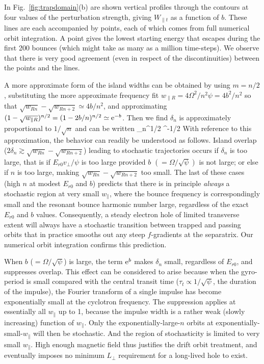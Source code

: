 \documentclass{agujournal2019}
\let\oldequation\equation
\let\oldendequation\endequation
\renewenvironment{equation}
  {\linenomathNonumbers\oldequation}
  {\oldendequation\endlinenomath}
\def\wp{w_\parallel}
\def\wr{w_{\parallel R}}
\begin{document}
In Fig.\ \ref{fig:trapdomain}(b) are shown vertical profiles through
the contours at four values of the perturbation strength, giving
$W_{\parallel t}$ as a function of $b$. These lines are each
accompanied by points, each of which comes from full numerical orbit
integration. A point gives the lowest starting energy that escapes
during the first 200 bounces (which might take as many as a million
time-steps). We observe that there is very good agreement (even in
respect of the discontinuities) between the points and the lines. 

A more approximate form of the island widths can be obtained by using
$m=n/2$, substituting the more approximate frequency fit
$\wr =4\Omega^2/n^2\psi=4b^2/n^2$ so that
$\sqrt{w_{Rn}}-\sqrt{w_{Rn+2}}\simeq 4b/n^2$, and approximating
$(1-\sqrt{\wr })^{n/2} =(1-2b/n)^{n/2}\simeq {\rm e}^{-b}$. Then we
find $\delta_n$ is approximately proportional to $1/\sqrt{n}$ and can
be written
\begin{equation}
  \label{eq:halfomega}
 \delta_n\simeq{}^{1/2}
 ^{-1/2}
\end{equation}
With reference to this approximation, the behavior can readily be
understood as follows. Island overlap
($2\delta_n\gtrsim \sqrt{w_{Rn}}-\sqrt{w_{Rn+2}}$) leading to
stochastic trajectories occurs if $\delta_n$ is too large, that is if
$E_{r0}v_\perp/\psi$ is too large provided $b$ $(=\Omega/\sqrt\psi)$ is not
large; or else if $n$ is too large, making
$\sqrt{w_{Rn}}-\sqrt{w_{Rn+2}}$ too small. The last of these cases (high $n$
at modest $E_{r0}$ and $b$) predicts that there is in principle
\emph{always} a stochastic region at very small $\wp$, where the
bounce frequency is correspondingly small and the resonant bounce
harmonic number large, regardless of the exact $E_{r0}$ and $b$
values. Consequently, a steady electron hole of limited transverse
extent will always have a stochastic transition between trapped and
passing orbits that in practice smooths out any steep $f$-gradients at
the separatrix. Our numerical orbit integration confirms this
prediction.

When $b$ ($=\Omega/\sqrt\psi$) is large, the term ${\rm e}^b$ makes
$\delta_n$ small, regardless of $E_{r0}$, and suppresses overlap. This
effect can be considered to arise because when the gyro-period is
small compared with the central transit time
($\tau_t\propto 1/\sqrt\psi$, the duration of the impulse), the
Fourier transform of a single impulse has become exponentially small
at the cyclotron frequency. The suppression applies at essentially all
$\wp$ up to 1, because the impulse width is a rather weak (slowly
increasing) function of $\wp$. Only the exponentially-large-$n$ orbits
at exponentially-small-$\wp$ will then be stochastic. And the region
of stochasticity is limited to very small $\wp$. High enough
magnetic field thus justifies the drift orbit treatment, and
eventually imposes no minimum $L_\perp$ requirement for a long-lived
hole to exist.
\end{document}
